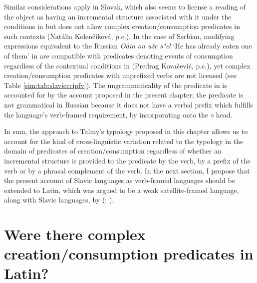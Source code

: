 \documentclass[output=paper,colorlinks,citecolor=brown]{langscibook}
\begin{document}
\noindent Similar considerations apply in Slovak, which also seems to license a reading of the object as having an incremental structure associated with it under the conditions in \citet{big:Mehlig2012} but does not allow complex creation/consumption predicates in such contexts (Natália Kolenčíková, p.c.). In the case of Serbian, modifying expressions equivalent to the Russian \textit{Odin on uže s"el} `He has already eaten one of them' in  are compatible with predicates denoting events of consumption regardless of the contextual conditions %
in \citet{big:Mehlig2012} (Predrag Kovačević, p.c.), yet complex creation/consumption predicates with unprefixed verbs are not licensed (see Table \ref{sim:tab:slavicccipfv}). %
The ungrammaticality of the predicate in  %
is accounted for by the %
account proposed in the present chapter; the predicate %
is not %
grammatical in Russian %
because %
it does not have a verbal prefix which fulfills the language's verb-framed requirement, by incorporating onto the \textit{v} head. %

In sum, the approach to Talmy's typology proposed in this chapter allows us to account for the kind of cross-linguistic variation related to the typology in the domain of predicates of creation/consumption regardless of whether an incremental structure is provided to the predicate by the verb, by a prefix of the verb or by a phrasal complement of the verb. In the next section, I propose that the present account of Slavic languages as verb-framed languages should be extended to Latin, which was argued to be a weak satellite-framed language, along with Slavic languages, by \citeauthor{Acedo-Matellan2010} (\citeyear{Acedo-Matellan2010}; \citeyear{Acedo-Matellan2016}).


\section{Were there complex creation/consumption predicates in Latin?}\label{5}
 
\end{document}

